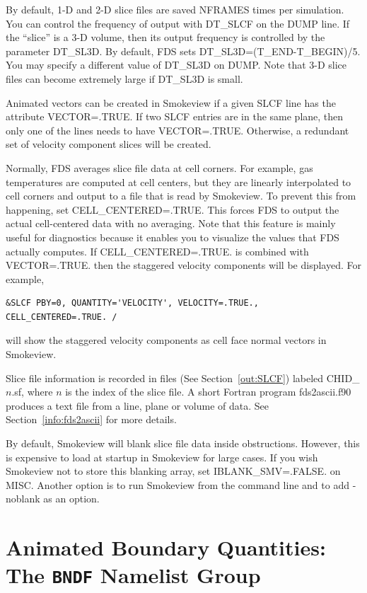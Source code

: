 \documentclass[11pt]{book}
\begin{document}
By default, 1-D and 2-D slice files are saved {\ct NFRAMES} times per simulation. You can control the frequency of output with {\ct DT\_SLCF} on the {\ct DUMP} line. If the ``slice'' is a 3-D volume, then its output frequency is controlled by the parameter {\ct DT\_SL3D}.  By default, FDS sets {\ct DT\_SL3D=(T\_END-T\_BEGIN)/5}.  You may specify a different value of {\ct DT\_SL3D} on {\ct DUMP}.  Note that 3-D slice files can become extremely large if {\ct DT\_SL3D} is small.

Animated vectors can be created in Smokeview if a given {\ct SLCF} line has the attribute {\ct VECTOR=.TRUE.} If two {\ct SLCF} entries are in the same plane, then only one of the lines needs to have {\ct VECTOR=.TRUE.} Otherwise, a redundant set of velocity component slices will be created.

Normally, FDS averages slice file data at cell corners. For example, gas temperatures are computed at cell centers, but they are linearly interpolated to cell corners and output to a file that is read by Smokeview. To prevent this from happening, set {\ct CELL\_CENTERED=.TRUE.} This forces FDS to output the actual cell-centered data with no averaging. Note that this feature is mainly useful for diagnostics because it enables you to visualize the values that FDS actually computes.  If {\ct CELL\_CENTERED=.TRUE.} is combined with {\ct VECTOR=.TRUE.} then the staggered velocity components will be displayed.  For example,
\begin{lstlisting}
&SLCF PBY=0, QUANTITY='VELOCITY', VELOCITY=.TRUE., CELL_CENTERED=.TRUE. /
\end{lstlisting}
will show the staggered velocity components as cell face normal vectors in Smokeview.

Slice file information is recorded in files (See Section~\ref{out:SLCF}) labeled {\ct CHID\_$n$.sf}, where $n$ is the index of the slice file. A short Fortran program {\ct fds2ascii.f90} produces a text file from a line, plane or volume of data. See Section~\ref{info:fds2ascii} for more details.

By default, Smokeview will blank slice file data inside obstructions.  However, this is expensive to load at startup in Smokeview for large cases.  If you wish Smokeview not to store this blanking array, set {\ct IBLANK\_SMV=.FALSE.} on {\ct MISC}.  Another option is to run Smokeview from the command line and to add {\ct -noblank} as an option.


\section{Animated Boundary Quantities: The \texorpdfstring{{\tt BNDF}}{BNDF} Namelist Group}
\label{info:BNDF}
\end{document}
